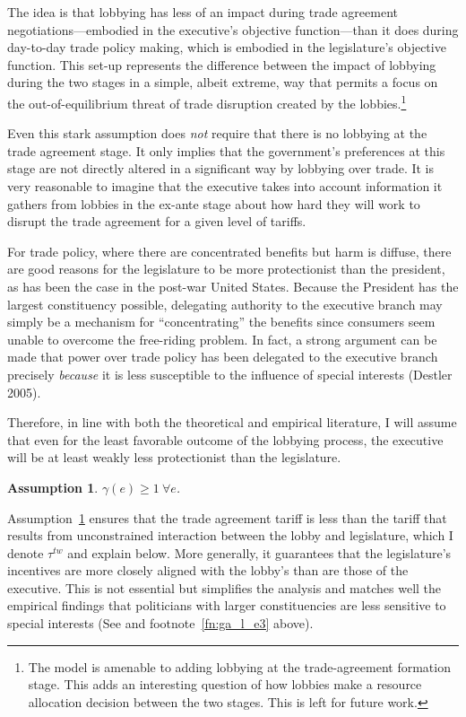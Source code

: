 \documentclass[authoryear, review]{elsarticle}
\newtheorem{assumption}{Assumption}
\newcommand{\ga}{\gamma}
\begin{document}
The idea is that lobbying has less of an impact during trade agreement negotiations---embodied in the executive's objective function---than it does during day-to-day trade policy making, which is embodied in the legislature's objective function. This set-up represents the difference between the impact of lobbying during the two stages in a simple, albeit extreme, way that permits a focus on the out-of-equilibrium threat of trade disruption created by the lobbies.\footnote{The model is amenable to adding lobbying at the trade-agreement formation stage. This adds an interesting question of how lobbies make a resource allocation decision between the two stages. This is left for future work.} 

Even this stark assumption does \textit{not} require that there is no lobbying at the trade agreement stage. It only implies that the government's preferences at this stage are not directly altered in a significant way by lobbying over trade. It is very reasonable to imagine that the executive takes into account information it gathers from lobbies in the ex-ante stage about how hard they will work to disrupt the trade agreement for a given level of tariffs.

For trade policy, where there are concentrated benefits but harm is diffuse, there are good reasons for the legislature to be more protectionist than the president, as has been the case in the post-war United States. Because the President has the largest constituency possible, delegating authority to the executive branch may simply be a mechanism for ``concentrating'' the benefits since consumers seem unable to overcome the free-riding problem. In fact, a strong argument can be made that power over trade policy has been delegated to the executive branch precisely \textit{because} it is less susceptible to the influence of special interests (Destler 2005). %

Therefore, in line with both the theoretical and empirical literature, I will assume that even for the least favorable outcome of the lobbying process, the executive will be at least weakly less protectionist than the legislature. 

\begin{assumption}
  $\ga(e) \geq 1 \ \forall e$.
  \label{as:ga_l_e3}
\end{assumption}

Assumption~\ref{as:ga_l_e3} ensures that the trade agreement tariff is less than the tariff that results from unconstrained interaction between the lobby and legislature, which I denote $\tau^{tw}$ and explain below. More generally, it guarantees that the legislature's incentives are more closely aligned with the lobby's than are those of the executive. This is not essential but simplifies the analysis and matches well the empirical findings that politicians with larger constituencies are less sensitive to special interests (See \citet{destler} and footnote~\ref{fn:ga_l_e3} above).
\end{document}
